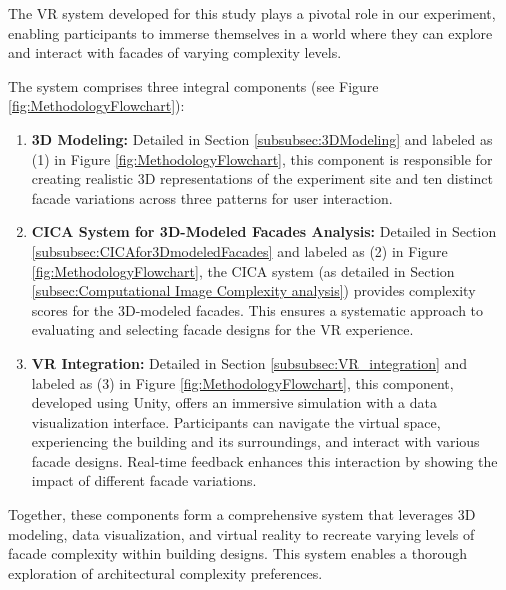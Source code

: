 The VR system developed for this study plays a pivotal role in our experiment, enabling participants to immerse themselves in a world where they can explore and interact with facades of varying complexity levels.

The system comprises three integral components (see Figure \ref{fig:MethodologyFlowchart}):

\begin{enumerate}
\item \textbf{3D Modeling:} Detailed in Section \ref{subsubsec:3DModeling} and labeled as (1) in Figure \ref{fig:MethodologyFlowchart}, this component is responsible for creating realistic 3D representations of the experiment site and ten distinct facade variations across three patterns for user interaction.

\item \textbf{CICA System for 3D-Modeled Facades Analysis:} Detailed in Section \ref{subsubsec:CICAfor3DmodeledFacades} and labeled as (2) in Figure \ref{fig:MethodologyFlowchart}, the CICA system (as detailed in Section \ref{subsec:Computational Image Complexity analysis}) provides complexity scores for the 3D-modeled facades.
This ensures a systematic approach to evaluating and selecting facade designs for the VR experience.

\item \textbf{VR Integration:} Detailed in Section \ref{subsubsec:VR_integration} and labeled as (3) in Figure \ref{fig:MethodologyFlowchart}, this component, developed using Unity, offers an immersive simulation with a data visualization interface.
Participants can navigate the virtual space, experiencing the building and its surroundings, and interact with various facade designs.
Real-time feedback enhances this interaction by showing the impact of different facade variations.
\end{enumerate}

Together, these components form a comprehensive system that leverages 3D modeling, data visualization, and virtual reality to recreate varying levels of facade complexity within building designs.
This system enables a thorough exploration of architectural complexity preferences.

